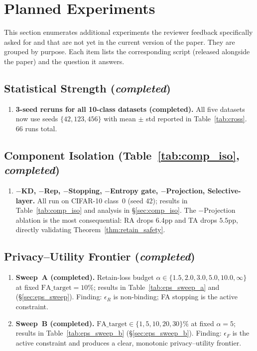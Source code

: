 \documentclass{article}
\newcommand{\new}[1]{{\color{orange}#1}}
\begin{document}
\new{
\section{Planned Experiments}\label{sec:planned}

This section enumerates additional experiments the reviewer feedback specifically asked for and that are not yet in the current version of the paper. They are grouped by purpose. Each item lists the corresponding script (released alongside the paper) and the question it answers.

\subsection{Statistical Strength (\new{\emph{completed}})}
\begin{enumerate}[nosep,leftmargin=*]
\item \new{\textbf{3-seed reruns for all 10-class datasets (completed).} All five datasets now use seeds $\{42, 123, 456\}$ with mean $\pm$ std reported in Table~\ref{tab:cross}. 66 runs total.}
\end{enumerate}

\subsection{Component Isolation (Table~\ref{tab:comp_iso}, \emph{completed})}
\begin{enumerate}[nosep,leftmargin=*]
\item \textbf{$-$KD, $-$Rep, $-$Stopping, $-$Entropy gate, $-$Projection, Selective-layer.} All run on CIFAR-10 class~0 (seed 42); results in Table~\ref{tab:comp_iso} and analysis in \S\ref{sec:comp_iso}. The $-$Projection ablation is the most consequential: RA drops $6.4$pp and TA drops $5.5$pp, directly validating Theorem~\ref{thm:retain_safety}.
\end{enumerate}

\subsection{Privacy--Utility Frontier (\emph{completed})}
\begin{enumerate}[nosep,leftmargin=*]
\item \textbf{Sweep~A (completed).} Retain-loss budget $\alpha \in \{1.5, 2.0, 3.0, 5.0, 10.0, \infty\}$ at fixed $\mathrm{FA\_target}=10\%$; results in Table~\ref{tab:eps_sweep_a} and \Cref{fig:eps_sweep_a} (\S\ref{sec:eps_sweep}). Finding: $\epsilon_R$ is non-binding; FA stopping is the active constraint.
\item \textbf{Sweep~B (completed).} $\mathrm{FA\_target} \in \{1, 5, 10, 20, 30\}$\% at fixed $\alpha = 5$; results in Table~\ref{tab:eps_sweep_b} (\S\ref{sec:eps_sweep_b}). Finding: $\epsilon_F$ is the active constraint and produces a clear, monotonic privacy--utility frontier.
\end{enumerate}

}
\end{document}
